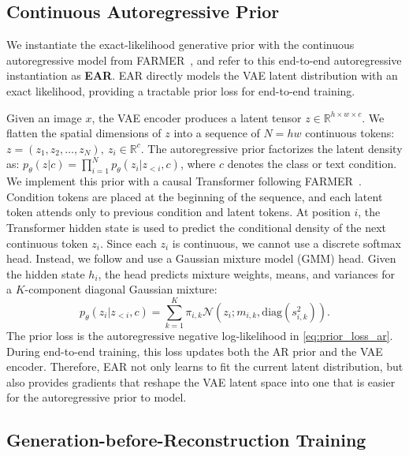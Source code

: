 \documentclass[]{bytedance_seed}
\begin{document}
\subsection{Continuous Autoregressive Prior}
\label{subsec:ar_prior}

We instantiate the exact-likelihood generative prior with the continuous autoregressive model from FARMER~\cite{zheng2025farmer}, and refer to this end-to-end autoregressive instantiation as \textbf{EAR}.
EAR directly models the VAE latent distribution with an exact likelihood, providing a tractable prior loss for end-to-end training.


Given an image $x$, the VAE encoder produces a latent tensor $z\in\mathbb{R}^{h\times w\times c}$.
We flatten the spatial dimensions of $z$ into a sequence of $N=hw$ continuous tokens: $z = (z_1, z_2, \ldots, z_N), \  z_i\in\mathbb{R}^{c}$.
The autoregressive prior factorizes the latent density as: $p_\theta(z|c)=\prod_{i=1}^{N}p_\theta(z_i|z_{<i},c)$, where $c$ denotes the class or text condition.
We implement this prior with a causal Transformer following FARMER~\cite{zheng2025farmer}.
Condition tokens are placed at the beginning of the sequence, and each latent token attends only to previous condition and latent tokens.
At position $i$, the Transformer hidden state is used to predict the conditional density of the next continuous token $z_i$.
Since each $z_i$ is continuous, we cannot use a discrete softmax head.
Instead, we follow \cite{tschannen2023givt,tschannen2024jetformer,zheng2025farmer} and use a Gaussian mixture model (GMM) head.
Given the hidden state $h_i$, the head predicts mixture weights, means, and variances for a $K$-component diagonal Gaussian mixture:
\begin{equation}
    p_\theta(z_i|z_{<i},c)
    =
    \sum_{k=1}^{K}
    \pi_{i,k}
    \mathcal{N}
    \left(
        z_i;
        m_{i,k},
        \mathrm{diag}(s_{i,k}^2)
    \right).
    \label{eq:gmm_head}
\end{equation}
The prior loss is the autoregressive negative log-likelihood in \cref{eq:prior_loss_ar}.
During end-to-end training, this loss updates both the AR prior and the VAE encoder.
Therefore, EAR not only learns to fit the current latent distribution, but also provides gradients that reshape the VAE latent space into one that is easier for the autoregressive prior to model.


\subsection{Generation-before-Reconstruction Training}
\label{subsec:gbr_training}
\end{document}
